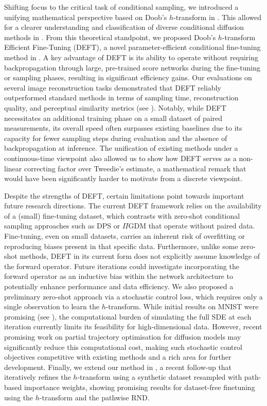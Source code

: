 Shifting focus to the critical task of conditional sampling, we introduced a unifying mathematical perspective based on Doob's $h$-transform in . This allowed for a clearer understanding and classification of diverse conditional diffusion methods in . From this theoretical standpoint, we proposed Doob’s \(h\)-transform Efficient Fine-Tuning (DEFT), a novel parameter-efficient conditional fine-tuning method in . A key advantage of DEFT is its ability to operate without requiring backpropagation through large, pre-trained score networks during the fine-tuning or sampling phases, resulting in significant efficiency gains. Our evaluations on several image reconstruction tasks demonstrated that DEFT reliably outperformed standard methods in terms of sampling time, reconstruction quality, and perceptual similarity metrics (see ). Notably, while DEFT necessitates an additional training phase on a small dataset of paired measurements, its overall speed often surpasses existing baselines due to its capacity for fewer sampling steps during evaluation and the absence of backpropagation at inference. The unification of existing methods under a continuous-time viewpoint also allowed us to show how DEFT serves as a non-linear correcting factor over Tweedie's estimate, a mathematical remark that would have been significantly harder to motivate from a discrete viewpoint. 

Despite the strengths of DEFT, certain limitations point towards important future research directions. The current DEFT framework relies on the availability of a (small) fine-tuning dataset, which contrasts with zero-shot conditional sampling approaches such as DPS or \(\Pi\)GDM that operate without paired data. Fine-tuning, even on small datasets, carries an inherent risk of overfitting or reproducing biases present in that specific data. Furthermore, unlike some zero-shot methods, DEFT in its current form does not explicitly assume knowledge of the forward operator. Future iterations could investigate incorporating the forward operator as an inductive bias within the network architecture to potentially enhance performance and data efficiency. We also proposed a preliminary zero-shot approach via a stochastic control loss, which requires only a single observation to learn the \(h\)-transform. While initial results on MNIST were promising (see ), the computational burden of simulating the full SDE at each iteration currently limits its feasibility for high-dimensional data. However, recent promising work on partial trajectory optimisation for diffusion models \citep{domingo2024adjoint} may significantly reduce this computational cost, making such stochastic control objectives competitive with existing methods and a rich area for further development. Finally, we extend our method in \textcite{denker2025iterative}, a recent follow-up that iteratively refines the $h$-transform using a synthetic dataset resampled with path-based importance weights, showing promising results for dataset-free finetuning using the $h$-transform and the pathwise RND.

